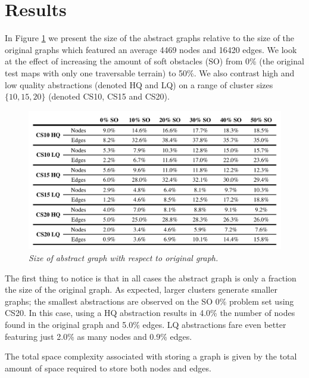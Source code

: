 \section{Results}
In Figure \ref{aha-fig:graphsize} we present the size of the abstract graphs relative to the size of the original graphs which featured an average 4469 nodes and 16420 edges. 
We look at the effect of increasing the amount of soft obstacles (SO) from 0\% (the original test maps with only one traversable terrain) to 50\%.
We also contrast high and low quality abstractions (denoted HQ and LQ) on a range of cluster sizes $\lbrace 10, 15, 20 \rbrace$ (denoted CS10, CS15 and CS20).
\begin{figure}[htbp]
	\vspace{-12pt}
       \caption{\small{\emph{Size of abstract graph with respect to original graph. }}}
       \begin{center}
                       \includegraphics[scale=0.35, trim = 20mm 14mm 20mm 5mm]{diagrams/graphsize.pdf}
       \end{center}
       \label{aha-fig:graphsize}
	\vspace{-4pt}
\end{figure}
\par \indent
The first thing to notice is that in all cases the abstract graph is only a fraction the size of the original graph.
As expected, larger clusters generate smaller graphs; the smallest abstractions are observed on the SO 0\% problem set using CS20. 
In this case, using a HQ abstraction results in 4.0\% the number of nodes found in the original graph and 5.0\% edges. 
LQ abstractions fare even better featuring just 2.0\% as many nodes and 0.9\% edges.
\par \indent
The total space complexity associated with storing a graph is given by the total amount of space required to store both nodes and edges.
